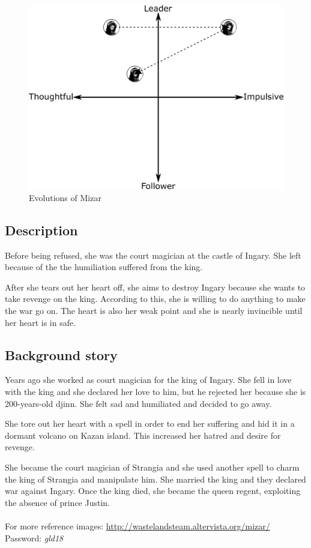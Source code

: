 \begin{figure}[H]
  \centering
  \includegraphics[width=14cm]{Images/Diagrams/Evolutions/mizarEvolution}
  \caption{Evolutions of Mizar}
\end{figure}

\subsection{Description}
Before being refused, she was the court magician at the castle of Ingary. She left because of the the humiliation suffered from the king.

After she tears out her heart off, she aims to destroy Ingary because she wants to take revenge on the king. According to this, she is willing to do anything to make the war go on. The heart is also her weak point and she is nearly invincible until her heart is in safe.

\subsection{Background story}
Years ago she worked as court magician for the king of Ingary. She fell in love with the king and she declared her love to him, but he rejected her because she is 200-years-old djinn. She felt sad and humiliated and decided to go away.

She tore out her heart with a spell in order to end her suffering and hid it in a dormant volcano on Kazan island. This increased her hatred and desire for revenge.

She became the court magician of Strangia and she used another spell to charm the king of Strangia and manipulate him. She married the king and they declared war against Ingary. Once the king died, she became the queen regent, exploiting the absence of prince Justin.\\\\
For more reference images: \href{http://wastelandsteam.altervista.org/mizar/}{http://wastelandsteam.altervista.org/mizar/}\\
Password: \textit{gld18}
